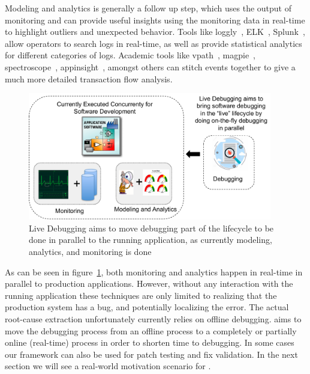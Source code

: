 Modeling and analytics is generally a follow up step, which uses the output of monitoring and can provide useful insights using the monitoring data in real-time to highlight outliers and unexpected behavior.
Tools like loggly~\cite{loggly}, ELK~\cite{elk}, Splunk~\cite{splunk}, allow operators to search logs in real-time, as well as provide statistical analytics for different categories of logs.
Academic tools like vpath~\cite{vpath}, magpie~\cite{magpie}, spectroscope~\cite{spectroscope}, appinsight~\cite{appinsight}, amongst others can stitch events together to give a much more detailed transaction flow analysis.

\begin{figure}[!ht]
	\begin{center}
		\includegraphics[width=0.95\textwidth]{intro/livedebuggingTrends.pdf}
		\caption{Live Debugging aims to move debugging part of the lifecycle to be done in parallel to the running application, as currently modeling, analytics, and monitoring is done}
		\label{fig:liveDebugTrends}
	\end{center}
\end{figure}


As can be seen in figure~\ref{fig:liveDebugTrends}, 
both monitoring and analytics happen in real-time in parallel to production applications. However, without any interaction with the running application these techniques are only limited to realizing that the production system has a bug, and potentially localizing the error.
The actual root-cause extraction unfortunately currently relies on offline debugging.
\parikshan aims to move the debugging process from an offline process to a completely or partially online (real-time) process in order to shorten time to debugging.
In some cases our framework can also be used for patch testing and fix validation.
In the next section we will see a real-world motivation scenario for \parikshan.


